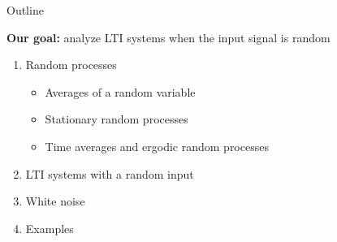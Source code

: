 \documentclass[10pt, handout]{beamer}
\begin{document}
\begin{frame}{Outline}

\textbf{Our goal:} analyze LTI systems when the input signal is random

\begin{enumerate}
	\item Random processes
	\begin{itemize}
		\item Averages of a random variable
		\item Stationary random processes
		\item Time averages and ergodic random processes
	\end{itemize}
	\item LTI systems with a random input
	\item White noise
	\item Examples
\end{enumerate}
\end{frame}

%
\end{document}
